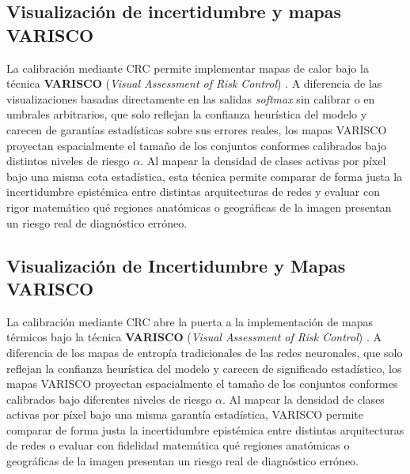 \subsection{Visualización de incertidumbre y mapas VARISCO}

La calibración mediante CRC permite implementar mapas de calor bajo la técnica \textbf{VARISCO} (\textit{Visual Assessment of Risk Control}) \cite{segment_cp_2024}. A diferencia de las visualizaciones basadas directamente en las salidas \textit{softmax} sin calibrar o en umbrales arbitrarios, que solo reflejan la confianza heurística del modelo y carecen de garantías estadísticas sobre sus errores reales, los mapas VARISCO proyectan espacialmente el tamaño de los conjuntos conformes calibrados bajo distintos niveles de riesgo $\alpha$. Al mapear la densidad de clases activas por píxel bajo una misma cota estadística, esta técnica permite comparar de forma justa la incertidumbre epistémica entre distintas arquitecturas de redes y evaluar con rigor matemático qué regiones anatómicas o geográficas de la imagen presentan un riesgo real de diagnóstico erróneo.

\subsection{Visualización de Incertidumbre y Mapas VARISCO}
La calibración mediante CRC abre la puerta a la implementación de mapas térmicos bajo la técnica \textbf{VARISCO} (\textit{Visual Assessment of Risk Control}) \cite{segment_cp_2024}. A diferencia de los mapas de entropía tradicionales de las redes neuronales, que solo reflejan la confianza heurística del modelo y carecen de significado estadístico, los mapas VARISCO proyectan espacialmente el tamaño de los conjuntos conformes calibrados bajo diferentes niveles de riesgo $\alpha$. Al mapear la densidad de clases activas por píxel bajo una misma garantía estadística, VARISCO permite comparar de forma justa la incertidumbre epistémica entre distintas arquitecturas de redes o evaluar con fidelidad matemática qué regiones anatómicas o geográficas de la imagen presentan un riesgo real de diagnóstico erróneo.

\vspace{1em}

